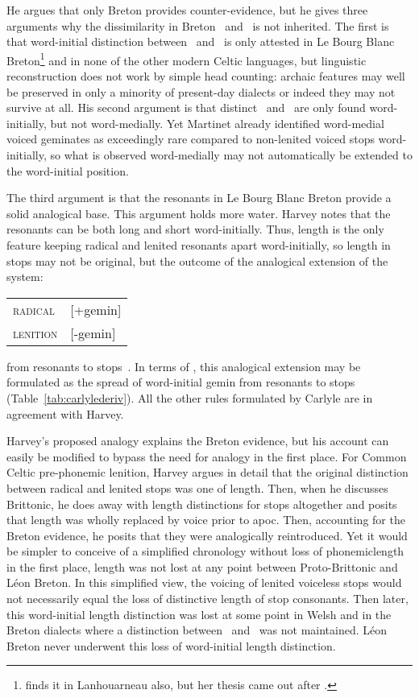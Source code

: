 He argues that only Breton provides counter-evidence, but he gives three arguments why the dissimilarity in Breton \lT\ and \xD\ is not inherited. The first is that word-initial distinction between \lT\ and \xD\ is only attested in Le Bourg Blanc Breton\footnote{\Textcite{carlyle_syllabic_1988} finds it in Lanhouarneau also, but her thesis came out after \textcite{harvey_aspects_1984}.} and in none of the other modern Celtic languages, but linguistic reconstruction does not work by simple head counting: archaic features may well be preserved in only a minority of present-day dialects or indeed they may not survive at all. His second argument is that distinct \lT\ and \xD\ are only found word-initially, but not word-medially. Yet Martinet already identified word-medial voiced geminates as exceedingly rare compared to non-lenited voiced stops word-initially, so what is observed word-medially may not automatically be extended to the word-initial position.

The third argument is that the resonants in Le Bourg Blanc Breton provide a solid analogical base. This argument holds more water. Harvey notes that the resonants  can be both long and short word-initially. Thus, length is the only feature keeping radical and lenited resonants apart word-initially, so length in stops may not be original, but the outcome of the analogical extension of the system:
\begin{center}
  \begin{tabular}{l@{~=~}l}
    \textsc{radical}  & [+\gls{gemin}]\\
    \textsc{lenition} & [-\gls{gemin}]
  \end{tabular}
\end{center}
from resonants to stops~\autocite{harvey_aspects_1984}. In terms of  \textcite{carlyle_syllabic_1988}, this analogical extension may be formulated as the spread of word-initial \gls{gemin} from resonants to stops (Table~\ref{tab:carlylederiv}). All the other rules formulated by Carlyle are in agreement with Harvey.

Harvey's proposed analogy explains the Breton evidence, but his account can easily be modified to bypass the need for  analogy in the first place. For Common Celtic pre-phonemic lenition, Harvey argues in detail that the original distinction between radical and lenited stops was one of length. Then, when he discusses Brittonic, he does away with length distinctions for stops altogether and posits that length was wholly replaced by voice prior to \gls{apoc}. Then, accounting for the Breton evidence, he posits that they were analogically reintroduced. Yet it would be simpler to conceive of a simplified chronology without  loss of phonemiclength in the first place, \ie length was not lost at any point between Proto-Brittonic and Léon Breton. In this simplified view, the voicing of lenited voiceless stops would not necessarily equal the loss of distinctive length of stop consonants. Then later, this word-initial length distinction was lost at some point in Welsh and in the Breton dialects where a distinction between \lT\ and \xD\ was not maintained. Léon Breton never underwent this loss of word-initial length distinction.

